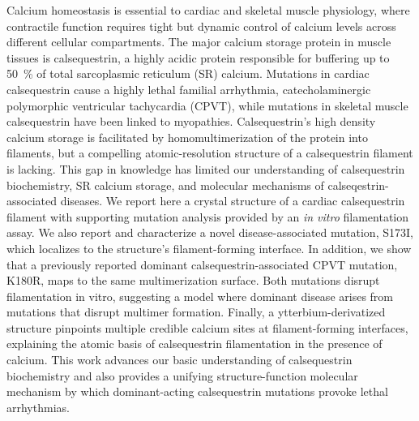 Calcium homeostasis is essential to cardiac and skeletal muscle physiology, where contractile function requires tight but dynamic control of calcium levels across different cellular compartments. The major calcium storage protein in muscle tissues is calsequestrin, a highly acidic protein responsible for buffering up to \SI{50}{\percent} of total sarcoplasmic reticulum (SR) calcium. Mutations in cardiac calsequestrin cause a highly lethal familial arrhythmia, catecholaminergic polymorphic ventricular tachycardia (CPVT), while mutations in skeletal muscle calsequestrin have been linked to myopathies. Calsequestrin's high density calcium storage is facilitated by homomultimerization of the protein into filaments, but a compelling atomic-resolution structure of a calsequestrin filament is lacking. This gap in knowledge has limited our understanding of calsequestrin biochemistry, SR calcium storage, and molecular mechanisms of calseqestrin-associated diseases. We report here a crystal structure of a cardiac calsequestrin filament with supporting mutation analysis provided by an \textit{in vitro} filamentation assay. We also report and characterize a novel disease-associated mutation, S173I, which localizes to the structure's filament-forming interface. In addition, we show that a previously reported dominant calsequestrin-associated CPVT mutation, K180R, maps to the same multimerization surface. Both mutations disrupt filamentation in vitro, suggesting a model where dominant disease arises from mutations that disrupt multimer formation. Finally, a ytterbium-derivatized structure pinpoints multiple credible calcium sites at filament-forming interfaces, explaining the atomic basis of calsequestrin filamentation in the presence of calcium. This work advances our basic understanding of calsequestrin biochemistry and also provides a unifying structure-function molecular mechanism by which dominant-acting calsequestrin mutations provoke lethal arrhythmias.